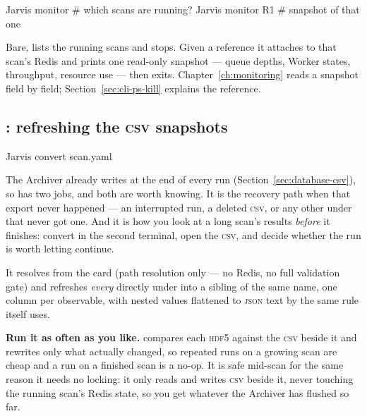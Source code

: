 \begin{terminal}
\begin{jcmd}
Jarvis monitor       # which scans are running?
Jarvis monitor R1    # snapshot of that one
\end{jcmd}
\end{terminal}

Bare,  lists the running scans and stops. Given a reference it attaches to
that scan's Redis and prints one read-only snapshot --- queue depths, Worker states,
throughput, resource use --- then exits. Chapter~\ref{ch:monitoring} reads a snapshot
field by field; Section~\ref{sec:cli-ps-kill} explains the reference.

\subsection{: refreshing the \textsc{csv} snapshots}
\label{sec:cli-convert}

\begin{terminal}
\begin{jcmd}
Jarvis convert scan.yaml
\end{jcmd}
\end{terminal}

The Archiver already writes  at the end of every run
(Section~\ref{sec:database-csv}), so  has two jobs, and both are worth
knowing. It is the recovery path when that export never happened --- an interrupted run,
a deleted \textsc{csv}, or any other  under  that never got
one. And it is how you look at a long scan's results \emph{before} it finishes: convert
in the second terminal, open the \textsc{csv}, and decide whether the run is worth
letting continue.

It resolves  from the card (path resolution only --- no Redis,
no full validation gate) and refreshes \emph{every}  directly under
 into a sibling  of the same name, one column per observable,
with nested values flattened to \textsc{json} text by the same rule 
itself uses.

\textbf{Run it as often as you like.}  compares each \textsc{hdf5} against
the \textsc{csv} beside it and rewrites only what actually changed, so repeated runs on a
growing scan are cheap and a run on a finished scan is a no-op. It is safe mid-scan for
the same reason it needs no locking: it only reads  and writes
\textsc{csv} beside it, never touching the running scan's Redis state, so you get whatever
the Archiver has flushed so far.

